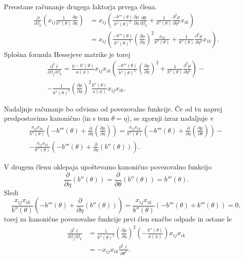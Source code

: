 \documentclass[12pt,a4paper]{amsart}
\theoremstyle{definition} %
\theoremstyle{plain} %
\begin{document}
Preostane računanje drugega faktorja prvega člena.
\begin{align*}
    \frac{\partial}{\partial\beta_{k}}\left(x_{ij}\frac{1}{b''(\theta)}\frac{\partial\mu}{\partial\eta}\right) &= x_{ij}\left(\frac{-b'''(\theta)}{b''(\theta)^2}\frac{\partial\mu}{\partial\eta}\frac{\partial\theta}{\partial\beta_{k}}
    +\frac{1}{b''(\theta)}\frac{\partial^2\mu}{\partial\eta^2}x_{ik}\right) \\
    &= x_{ij}\left(\frac{-b'''(\theta)}{b''(\theta)^2}\left(\frac{\partial\mu}{\partial\eta}\right)^2\frac{x_{ik}}{b''(\theta)} +
    \frac{1}{b''(\theta)}\frac{\partial^2\mu}{\partial\eta^2}x_{ik}\right).
\end{align*}
Splošna formula Hessejeve matrike je torej
\begin{multline}\label{splosniHesse}
    \frac{\partial^2\ell}{\partial\beta_{j}\partial\beta_{k}} = \frac{y-b'(\theta)}{a(\phi)} x_{ij}x_{ik}\left(\frac{-b'''(\theta)}{b''(\theta)^3}\left(\frac{\partial\mu}{\partial\eta}\right)^2 +
    \frac{1}{b''(\theta)}\frac{\partial^2\mu}{\partial\eta^2}\right) - \\
    -\frac{1}{b''(\theta)^2}\left(\frac{\partial\mu}{\partial\eta}\right)^2\frac{b''(\theta)}{a(\phi)}x_{ij}x_{ik}.
\end{multline}

Nadaljnje računanje bo odvisno od povezovalne funkcije. Če od tu naprej predpostavimo kanonično (in s tem $\theta = \eta$), se zgornji izraz nadaljuje v
\begin{multline*}
    \frac{x_{ij}x_{ik}}{b''(\theta)}\left(-b'''(\theta) + \frac{\partial}{\partial\eta}\left(\frac{\partial\mu}{\partial\eta}\right) \right) = \frac{x_{ij}x_{ik}}{b''(\theta)}\left(-b'''(\theta) + \frac{\partial}{\partial\eta}\left(\frac{\partial\mu}{\partial\theta}\right) \right) -\\
    -\frac{x_{ij}x_{ik}}{b''(\theta)}\left(-b'''(\theta) + \frac{\partial}{\partial\eta}\left(b''(\theta)\right) \right).
\end{multline*}

V drugem členu oklepaja upoštevamo kanonično povezovalno funkcijo
\[
    \frac{\partial}{\partial\eta}(b''(\theta)) = \frac{\partial}{\partial\theta}(b''(\theta)) = b'''(\theta).
\]
Sledi
\[
    \frac{x_{ij}x_{ik}}{b''(\theta)}\left(-b'''(\theta) + \frac{\partial}{\partial\eta}\left(b''(\theta)\right) \right) = \frac{x_{ij}x_{ik}}{b''(\theta)}\left(-b'''(\theta) + b'''(\theta) \right) = 0,
\]
torej za kanonične povezovalne funkcije prvi člen enačbe  odpade in ostane le
\begin{align}
    \frac{\partial^2\ell}{\partial\beta_{j}\partial\beta_{k}} &= \frac{1}{b''(\theta)^2}\left(\frac{\partial\mu}{\partial\eta}\right)^2\left(-\frac{b''(\theta)}{a(\phi)}\right)x_{ij}x_{ik} \\
    &=-x_{ij}x_{ik}\frac{\partial^2\ell}{\partial\theta^2}.
\end{align}
\end{document}
